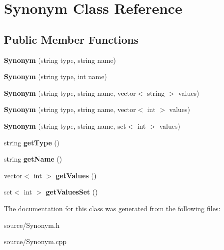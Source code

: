 \hypertarget{class_synonym}{}\section{Synonym Class Reference}
\label{class_synonym}
\subsection*{Public Member Functions}
\begin{DoxyCompactItemize}
\item 
\hypertarget{class_synonym_a5018ee6a00b4b4d41b6d5208e22ed2ca}{}{\bfseries Synonym} (string type, string name)\label{class_synonym_a5018ee6a00b4b4d41b6d5208e22ed2ca}

\item 
\hypertarget{class_synonym_aaf351be3854cd4835645eb4a15679ca9}{}{\bfseries Synonym} (string type, int name)\label{class_synonym_aaf351be3854cd4835645eb4a15679ca9}

\item 
\hypertarget{class_synonym_a1b53a4d8e42a061aa86f744a7421dcdd}{}{\bfseries Synonym} (string type, string name, vector$<$ string $>$ values)\label{class_synonym_a1b53a4d8e42a061aa86f744a7421dcdd}

\item 
\hypertarget{class_synonym_ae68f0dd55a4e3c9172c5eb3d68c7f7e6}{}{\bfseries Synonym} (string type, string name, vector$<$ int $>$ values)\label{class_synonym_ae68f0dd55a4e3c9172c5eb3d68c7f7e6}

\item 
\hypertarget{class_synonym_a2a0e69ca96fb0878b36396ea65563189}{}{\bfseries Synonym} (string type, string name, set$<$ int $>$ values)\label{class_synonym_a2a0e69ca96fb0878b36396ea65563189}

\item 
\hypertarget{class_synonym_aa1e2d6af1ec0d7504c973a67f8d4b233}{}string {\bfseries get\+Type} ()\label{class_synonym_aa1e2d6af1ec0d7504c973a67f8d4b233}

\item 
\hypertarget{class_synonym_a91c02afdb9a58abf5c9c994d8c9f659a}{}string {\bfseries get\+Name} ()\label{class_synonym_a91c02afdb9a58abf5c9c994d8c9f659a}

\item 
\hypertarget{class_synonym_a0fd6d2102b4a194c4f63665beabadae1}{}vector$<$ int $>$ {\bfseries get\+Values} ()\label{class_synonym_a0fd6d2102b4a194c4f63665beabadae1}

\item 
\hypertarget{class_synonym_a2c13b39c812164ca8fce408e177d3aa9}{}set$<$ int $>$ {\bfseries get\+Values\+Set} ()\label{class_synonym_a2c13b39c812164ca8fce408e177d3aa9}

\end{DoxyCompactItemize}


The documentation for this class was generated from the following files\+:\begin{DoxyCompactItemize}
\item 
source/Synonym.\+h\item 
source/Synonym.\+cpp\end{DoxyCompactItemize}
